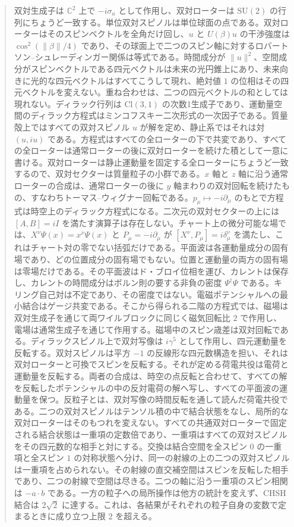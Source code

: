 \documentclass[a4paper]{article}
\begin{document}
\begin{abstract}
双対生成子は $\mathbb{C}^2$ 上で $-i\sigma_a$ として作用し、双対ローターは $\mathrm{SU}(2)$ の行列にちょうど一致する。単位双対スピノルは単位球面の点である。双対ローターはそのスピンベクトルを全角だけ回し、$u$ と $U(\beta)u$ の干渉強度は $\cos^2(\lVert\beta\rVert/4)$ であり、その球面上で二つのスピン軸に対するロバートソン--シュレーディンガー関係は等式である。時間成分が $\lVert u\rVert^2$、空間成分がスピンベクトルである四元ベクトルは未来の光円錐上にあり、未来向きに光的な四元ベクトルはすべてこうして現れ、絶対値 $1$ の位相はその四元ベクトルを変えない。重ね合わせは、二つの四元ベクトルの和としては現れない。ディラック行列は $\mathrm{Cl}(3,1)$ の次数1生成子であり、運動量空間のディラック方程式はミンコフスキー二次形式の一次因子である。質量殻上ではすべての双対スピノル $u$ が解を定め、静止系ではそれは対 $(u,iu)$ である。方程式はすべての全ローターの下で共変であり、すべての全ローターは通常ローターの後に双対ローターを続けた積として一意に書ける。双対ローターは静止運動量を固定する全ローターにちょうど一致するので、双対セクターは質量粒子の小群である。$x$ 軸と $z$ 軸に沿う通常ローターの合成は、通常ローターの後に $y$ 軸まわりの双対回転を続けたもの、すなわちトーマス--ウィグナー回転である。$p_\mu\mapsto -i\partial_\mu$ のもとで方程式は時空上のディラック方程式になる。二次元の双対セクターの上には $[A,B]=iI$ を満たす演算子は存在しない。チャート上の微分可能な場では、$X^\nu\Psi(x)=x^\nu\Psi(x)$ と $P_\mu=-i\partial_\mu$ が $[X^\nu,P_\mu]=i\delta^\nu_\mu$ を満たし、これはチャート対の零でない括弧だけである。平面波は各運動量成分の固有場であり、どの位置成分の固有場でもない。位置と運動量の両方の固有場は零場だけである。その平面波はド・ブロイ位相を運び、カレントは保存し、カレントの時間成分はボルン則の要する非負の密度 $\Psi^\dagger\Psi$ である。キリング自己対は不定であり、その密度ではない。電磁ポテンシャルへの最小結合はゲージ共変である。そこから得られる二階の方程式では、磁場は双対生成子を通じて両ワイルブロックに同じく磁気回転比 $2$ で作用し、電場は通常生成子を通じて作用する。磁場中のスピン歳差は双対回転である。ディラックスピノル上で双対写像は $i\gamma^5$ として作用し、四元運動量を反転する。双対スピノルは平方 $-1$ の反線形な四元数構造を担い、それは双対ローターと可換でスピンを反転する。それが定める荷電共役は電荷と運動量を反転する。両者の合成は、時空の点反転と合わせて、すべての解を反転したポテンシャルの中の反対電荷の解へ写し、すべての平面波の運動量を保つ。反粒子とは、双対写像の時間反転を通して読んだ荷電共役である。二つの双対スピノルはテンソル積の中で結合状態をなし、局所的な双対ローターはそのもつれを変えない。すべての共通双対ローターで固定される結合状態は一重項の定数倍であり、一重項はすべての双対スピノルをその四元数的な相手と対にする。交換は結合空間を全スピン $0$ の一重項と全スピン $1$ の対称状態へ分け、同一の射線の上の二つの双対スピノルは一重項を占められない。その射線の直交補空間はスピンを反転した相手であり、二つの射線で空間は尽きる。二つの軸に沿う一重項のスピン相関は $-a\cdot b$ である。一方の粒子への局所操作は他方の統計を変えず、CHSH 結合は $2\sqrt2$ に達する。これは、各結果がそれぞれの粒子自身の変数で定まるときに成り立つ上限 $2$ を超える。


\end{abstract}
\end{document}
